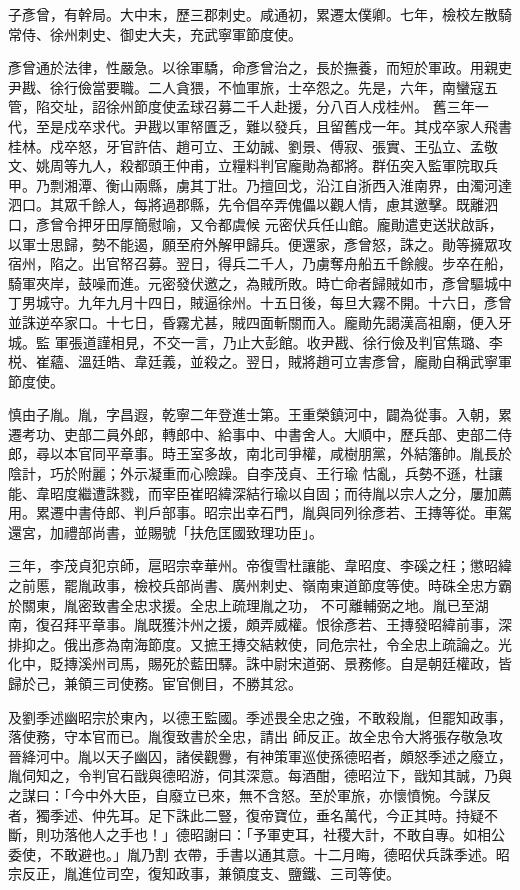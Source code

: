 \begin{pinyinscope}
 子彥曾，有幹局。大中末，歷三郡刺史。咸通初，累遷太僕卿。七年，檢校左散騎常侍、徐州刺史、御史大夫，充武寧軍節度使。



 彥曾通於法律，性嚴急。以徐軍驕，命彥曾治之，長於撫養，而短於軍政。用親吏尹戡、徐行儉當要職。二人貪猥，不恤軍旅，士卒怨之。先是，六年，南蠻寇五管，陷交址，詔徐州節度使孟球召募二千人赴援，分八百人戍桂州。
 舊三年一代，至是戍卒求代。尹戡以軍帑匱乏，難以發兵，且留舊戍一年。其戍卒家人飛書桂林。戍卒怒，牙官許佶、趙可立、王幼誠、劉景、傅寂、張實、王弘立、孟敬文、姚周等九人，殺都頭王仲甫，立糧料判官龐勛為都將。群伍突入監軍院取兵甲。乃剽湘潭、衡山兩縣，虜其丁壯。乃擅回戈，沿江自浙西入淮南界，由濁河達泗口。其眾千餘人，每將過郡縣，先令倡卒弄傀儡以觀人情，慮其邀擊。既離泗口，彥曾令押牙田厚簡慰喻，又令都虞候
 元密伏兵任山館。龐勛遣吏送狀啟訴，以軍士思歸，勢不能遏，願至府外解甲歸兵。便還家，彥曾怒，誅之。勛等擁眾攻宿州，陷之。出官帑召募。翌日，得兵二千人，乃虜奪舟船五千餘艘。步卒在船，騎軍夾岸，鼓噪而進。元密發伏邀之，為賊所敗。時亡命者歸賊如市，彥曾驅城中丁男城守。九年九月十四日，賊逼徐州。十五日後，每旦大霧不開。十六日，彥曾並誅逆卒家口。十七日，昏霧尤甚，賊四面斬關而入。龐勛先謁漢高祖廟，便入牙城。監
 軍張道謹相見，不交一言，乃止大彭館。收尹戡、徐行儉及判官焦璐、李棁、崔蘊、溫廷皓、韋廷義，並殺之。翌日，賊將趙可立害彥曾，龐勛自稱武寧軍節度使。



 慎由子胤。胤，字昌遐，乾寧二年登進士第。王重榮鎮河中，闢為從事。入朝，累遷考功、吏部二員外郎，轉郎中、給事中、中書舍人。大順中，歷兵部、吏部二侍郎，尋以本官同平章事。時王室多故，南北司爭權，咸樹朋黨，外結籓帥。胤長於陰計，巧於附麗；外示凝重而心險躁。自李茂貞、王行瑜
 怙亂，兵勢不遜，杜讓能、韋昭度繼遭誅戮，而宰臣崔昭緯深結行瑜以自固；而待胤以宗人之分，屢加薦用。累遷中書侍郎、判戶部事。昭宗出幸石門，胤與同列徐彥若、王摶等從。車駕還宮，加禮部尚書，並賜號「扶危匡國致理功臣」。



 三年，李茂貞犯京師，扈昭宗幸華州。帝復雪杜讓能、韋昭度、李磎之枉；懲昭緯之前慝，罷胤政事，檢校兵部尚書、廣州刺史、嶺南東道節度等使。時硃全忠方霸於關東，胤密致書全忠求援。全忠上疏理胤之功，
 不可離輔弼之地。胤已至湖南，復召拜平章事。胤既獲汴州之援，頗弄威權。恨徐彥若、王摶發昭緯前事，深排抑之。俄出彥為南海節度。又摭王摶交結敕使，同危宗社，令全忠上疏論之。光化中，貶摶溪州司馬，賜死於藍田驛。誅中尉宋道弼、景務修。自是朝廷權政，皆歸於己，兼領三司使務。宦官側目，不勝其忿。



 及劉季述幽昭宗於東內，以德王監國。季述畏全忠之強，不敢殺胤，但罷知政事，落使務，守本官而已。胤復致書於全忠，請出
 師反正。故全忠令大將張存敬急攻晉絳河中。胤以天子幽囚，諸侯觀釁，有神策軍巡使孫德昭者，頗怒季述之廢立，胤伺知之，令判官石戩與德昭游，伺其深意。每酒酣，德昭泣下，戩知其誠，乃與之謀曰：「今中外大臣，自廢立已來，無不含怒。至於軍旅，亦懷憤惋。今謀反者，獨季述、仲先耳。足下誅此二豎，復帝寶位，垂名萬代，今正其時。持疑不斷，則功落他人之手也！」德昭謝曰：「予軍吏耳，社稷大計，不敢自專。如相公委使，不敢避也。」胤乃割
 衣帶，手書以通其意。十二月晦，德昭伏兵誅季述。昭宗反正，胤進位司空，復知政事，兼領度支、鹽鐵、三司等使。




\end{pinyinscope}
